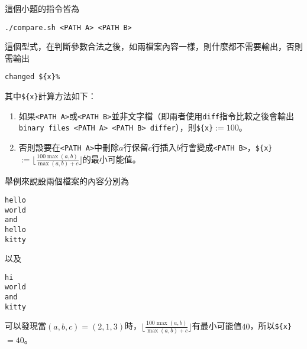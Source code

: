 這個小題的指令皆為
\begin{lstlisting}
./compare.sh <PATH A> <PATH B>
\end{lstlisting}
這個型式，在判斷參數合法之後，如兩檔案內容一樣，則什麼都不需要輸出，否則需輸出
\begin{lstlisting}
changed ${x}%
\end{lstlisting}
其中\texttt{\$\{x\}}計算方法如下：
\begin{enumerate}
\item 如果\texttt{<PATH A>}或\texttt{<PATH B>}並非文字檔（即兩者使用\texttt{diff}指令比較之後會輸出\texttt{binary files <PATH A> <PATH B> differ}），則\texttt{\$\{x\}}$:=100$。
\item 否則設要在\texttt{<PATH A>}中刪除$a$行保留$c$行插入$b$行會變成\texttt{<PATH B>}，\texttt{\$\{x\}}$:=\lfloor\frac{100\max(a, b)}{\max(a, b)+c}\rfloor$的最小可能值。
\end{enumerate}
舉例來說設兩個檔案的內容分別為
\begin{lstlisting}
hello
world
and
hello
kitty
\end{lstlisting}
以及
\begin{lstlisting}
hi
world
and
kitty
\end{lstlisting}
可以發現當$(a, b, c)=(2, 1, 3)$時，$\lfloor\frac{100\max(a, b)}{\max(a, b)+c}\rfloor$有最小可能值$40$，所以\texttt{\$\{x\}}$=40$。
